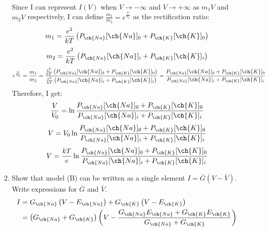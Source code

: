 \documentclass[11pt]{article}
\begin{document}
\begin{enumerate}[label=\arabic*.]
\begin{enumerate}[label=(\alph*)]
\begin{align*}
\end{align*}
Since I can represent $I(V)$ when $V \rightarrow -\infty$ and $V \rightarrow +\infty$ as $m_1 V$ and $m_2 V$ respectively, I can define $\frac{m_1} {m_2} = e^{\frac{V} {V_0}}$ as the rectification ratio:
\begin{align*}
m_1 = \frac{e^2} {kT} \left(P_{\ch{Na}} [\ch{Na}]_0 + P_{\ch{K}} [\ch{K}]_0\right) \\
\end{align*}
\begin{align*}
m_2 = \frac{e^2} {kT} \left(P_{\ch{Na}} [\ch{Na}]_i + P_{\ch{K}} [\ch{K}]_i\right) \\
\end{align*}
\begin{align*}
e^{\frac{V} {V_0}} = \frac{m_1} {m_2} = \frac{\frac{e^2} {kT} \left(P_{\ch{Na}} [\ch{Na}]_0 + P_{\ch{K}} [\ch{K}]_0\right)} {\frac{e^2} {kT} \left(P_{\ch{Na}} [\ch{Na}]_i + P_{\ch{K}} [\ch{K}]_i\right)} = \frac{P_{\ch{Na}} [\ch{Na}]_0 + P_{\ch{K}} [\ch{K}]_0} {P_{\ch{Na}} [\ch{Na}]_i + P_{\ch{K}} [\ch{K}]_i}
\end{align*}
Therefore, I get:
\begin{align*}
\frac{V} {V_0} = \ln{\frac{P_{\ch{Na}} [\ch{Na}]_0 + P_{\ch{K}} [\ch{K}]_0} {P_{\ch{Na}} [\ch{Na}]_i + P_{\ch{K}} [\ch{K}]_i}}
\end{align*}
\begin{align*}
V = V_0 \ln{\frac{P_{\ch{Na}} [\ch{Na}]_0 + P_{\ch{K}} [\ch{K}]_0} {P_{\ch{Na}} [\ch{Na}]_i + P_{\ch{K}} [\ch{K}]_i}}
\end{align*}
\begin{align*}
V = \frac{kT} {e} \ln{\frac{P_{\ch{Na}} [\ch{Na}]_0 + P_{\ch{K}} [\ch{K}]_0} {P_{\ch{Na}} [\ch{Na}]_i + P_{\ch{K}} [\ch{K}]_i}}
\end{align*}



\item
Show that model (B) can be written as a single element $I = \bar{G}(V - \bar{V})$. Write expressions for $\bar{G}$ and $\bar{V}$.
\begin{align*}
I &= G_{\ch{Na}}\left(V - E_{\ch{Na}}\right) + G_{\ch{K}}\left(V - E_{\ch{K}}\right) \\
&= \left(G_{\ch{Na}} + G_{\ch{K}}\right) \left(V - \frac{G_{\ch{Na}} E_{\ch{Na}} + G_{\ch{K}} E_{\ch{K}}} {G_{\ch{Na}} + G_{\ch{K}}}\right)
\end{align*}




\end{enumerate}
\end{enumerate}
\end{document}
